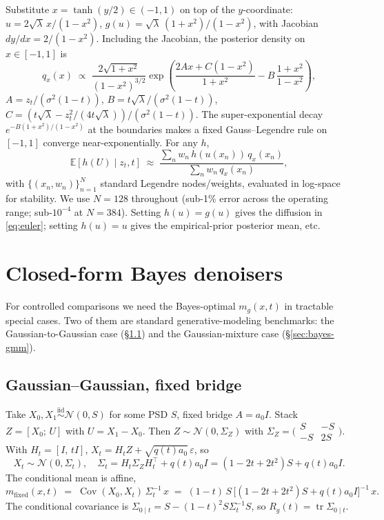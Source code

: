 \documentclass[11pt]{article}
\newcommand{\E}{\mathbb{E}}
\newcommand{\Cov}{\operatorname{Cov}}
\newcommand{\N}{\mathcal{N}}
\newcommand{\tr}{\operatorname{tr}}
\begin{document}
Substitute $x=\tanh(y/2)\in(-1,1)$ on top of the $y$-coordinate:
$u = 2\sqrt\lambda\, x/(1-x^2)$, $g(u)=\sqrt\lambda\,(1+x^2)/(1-x^2)$, with
Jacobian $dy/dx=2/(1-x^2)$. Including the Jacobian, the posterior
density on $x\in[-1,1]$ is
\begin{equation}
    q_x(x)\;\propto\;\frac{2\sqrt{1+x^2}}{(1-x^2)^{3/2}}\exp\!\left(\frac{2 A x + C(1-x^2)}{1+x^2} - B\,\frac{1+x^2}{1-x^2}\right),
    \label{eq:qx}
\end{equation}
$A = z_t/(\sigma^2(1-t))$, $B = t\sqrt\lambda/(\sigma^2(1-t))$,
$C = (t\sqrt\lambda - z_t^2/(4t\sqrt\lambda))/(\sigma^2(1-t))$. The
super-exponential decay $e^{-B(1+x^2)/(1-x^2)}$ at the boundaries makes
a fixed Gauss--Legendre rule on $[-1,1]$ converge near-exponentially.
For any $h$,
\begin{equation}
    \E[h(U)\mid z_t,t]\;\approx\;\frac{\sum_n w_n\,h(u(x_n))\,q_x(x_n)}{\sum_n w_n\,q_x(x_n)},
    \label{eq:gl}
\end{equation}
with $\{(x_n,w_n)\}_{n=1}^N$ standard Legendre nodes/weights, evaluated
in log-space for stability. We use $N=128$ throughout (sub-1\% error
across the operating range; sub-$10^{-4}$ at $N=384$). Setting
$h(u)=g(u)$ gives the diffusion in \eqref{eq:euler}; setting $h(u)=u$
gives the empirical-prior posterior mean, etc.

\section{Closed-form Bayes denoisers}
\label{sec:bayes}

For controlled comparisons we need the Bayes-optimal $m_g(x,t)$ in
tractable special cases. Two of them are standard generative-modeling
benchmarks: the Gaussian-to-Gaussian case (\S\ref{sec:bayes-gauss}) and
the Gaussian-mixture case (\S\ref{sec:bayes-gmm}).

\subsection{Gaussian--Gaussian, fixed bridge}
\label{sec:bayes-gauss}

Take $X_0,X_1\overset{\text{iid}}{\sim}\N(0,S)$ for some PSD $S$, fixed
bridge $A=a_0 I$. Stack $Z=[X_0;\,U]$ with $U=X_1-X_0$. Then
$Z\sim\N(0,\Sigma_Z)$ with $\Sigma_Z=\bigl(\begin{smallmatrix} S & -S \\ -S & 2S \end{smallmatrix}\bigr)$.
With $H_t=[I,\,tI]$, $X_t = H_t Z + \sqrt{q(t) a_0}\,\varepsilon$, so
\[
    X_t\sim\N(0,\Sigma_t),\quad \Sigma_t = H_t \Sigma_Z H_t^\top + q(t) a_0 I = (1-2t+2t^2) S + q(t) a_0 I.
\]
The conditional mean is affine,
\begin{equation}
    \boxed{
    m_{\text{fixed}}(x,t) \;=\; \Cov(X_0, X_t)\,\Sigma_t^{-1}\,x
    \;=\; (1-t)\,S\,\big[(1-2t+2t^2)S + q(t)a_0 I\big]^{-1}\,x.
    }
    \label{eq:m-gauss-fixed}
\end{equation}
The conditional covariance is
$\Sigma_{0\mid t} = S - (1-t)^2 S\Sigma_t^{-1} S$, so
$R_g(t) = \tr\Sigma_{0\mid t}$.
\end{document}
